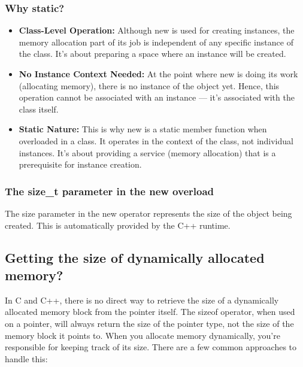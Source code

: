 \documentclass{report}
\begin{document}
\begin{concept}
    \subsubsection{Why static?}
    \begin{itemize}
        \item \textbf{Class-Level Operation:} Although new is used for creating instances, the memory allocation part of its job is independent of any specific instance of the class. It's about preparing a space where an instance will be created.
        \item \textbf{No Instance Context Needed:} At the point where new is doing its work (allocating memory), there is no instance of the object yet. Hence, this operation cannot be associated with an instance — it's associated with the class itself.
        \item \textbf{Static Nature:} This is why new is a static member function when overloaded in a class. It operates in the context of the class, not individual instances. It's about providing a service (memory allocation) that is a prerequisite for instance creation.
    \end{itemize}
    \pagebreak 
    \subsubsection{The size\_t parameter in the new overload}
    \bigbreak \noindent 
     The size parameter in the new operator represents the size of the object being created. This is automatically provided by the C++ runtime.

     \bigbreak \noindent 
    \subsection{Getting the size of dynamically allocated memory?}
    \bigbreak \noindent 
    \begin{concept}
        In C and C++, there is no direct way to retrieve the size of a dynamically allocated memory block from the pointer itself. The sizeof operator, when used on a pointer, will always return the size of the pointer type, not the size of the memory block it points to. 
        \bigbreak \noindent 
        When you allocate memory dynamically, you're responsible for keeping track of its size. There are a few common approaches to handle this:
    \end{concept}


    \bigbreak \noindent 

\end{concept}
\end{document}
